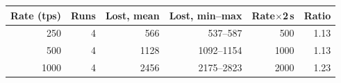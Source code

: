 \begin{tabular}{rrrrrr}
\toprule
Rate (tps) & Runs & Lost, mean & Lost, min--max & Rate$\times$2\,s & Ratio \\
\midrule
250 & 4 & 566 & 537--587 & 500 & 1.13 \\
500 & 4 & 1128 & 1092--1154 & 1000 & 1.13 \\
1000 & 4 & 2456 & 2175--2823 & 2000 & 1.23 \\
\bottomrule
\end{tabular}
